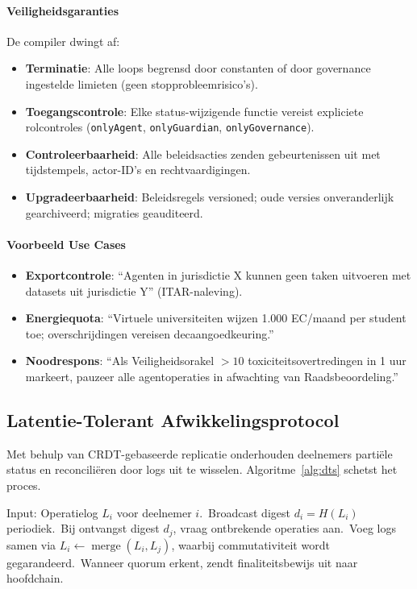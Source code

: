 \documentclass[11pt]{article}
\begin{document}
\paragraph{Veiligheidsgaranties} De compiler dwingt af:
\begin{itemize}[noitemsep]
  \item \textbf{Terminatie}: Alle loops begrensd door constanten of door governance ingestelde limieten (geen stopprobleemrisico's).
  \item \textbf{Toegangscontrole}: Elke status-wijzigende functie vereist expliciete rolcontroles (\texttt{onlyAgent}, \texttt{onlyGuardian}, \texttt{onlyGovernance}).
  \item \textbf{Controleerbaarheid}: Alle beleidsacties zenden gebeurtenissen uit met tijdstempels, actor-ID's en rechtvaardigingen.
  \item \textbf{Upgradeerbaarheid}: Beleidsregels versioned; oude versies onveranderlijk gearchiveerd; migraties geauditeerd.
\end{itemize}

\paragraph{Voorbeeld Use Cases}
\begin{itemize}[noitemsep]
  \item \textbf{Exportcontrole}: ``Agenten in jurisdictie X kunnen geen taken uitvoeren met datasets uit jurisdictie Y'' (ITAR-naleving).
  \item \textbf{Energiequota}: ``Virtuele universiteiten wijzen 1.000 EC/maand per student toe; overschrijdingen vereisen decaangoedkeuring.''
  \item \textbf{Noodrespons}: ``Als Veiligheidsorakel $>10$ toxiciteitsovertredingen in 1 uur markeert, pauzeer alle agentoperaties in afwachting van Raadsbeoordeling.''
\end{itemize}

\subsection{Latentie-Tolerant Afwikkelingsprotocol}
Met behulp van CRDT-gebaseerde replicatie onderhouden deelnemers partiële status en reconciliëren door logs uit te wisselen. Algoritme~\ref{alg:dts} schetst het proces.

\begin{algorithm}[H]
  \caption{Latentie-Tolerante Afwikkeling (DTS)}
  \label{alg:dts}
  \begin{algorithmic}[1]
    \STATE Input: Operatielog $L_i$ voor deelnemer $i$.\
    \STATE Broadcast digest $d_i = H(L_i)$ periodiek.\
    \STATE Bij ontvangst digest $d_j$, vraag ontbrekende operaties aan.\
    \STATE Voeg logs samen via $L_i \leftarrow \operatorname{merge}(L_i, L_j)$, waarbij commutativiteit wordt gegarandeerd.\
    \STATE Wanneer quorum erkent, zendt finaliteitsbewijs uit naar hoofdchain.\
  \end{algorithmic}
\end{algorithm}
\end{document}
